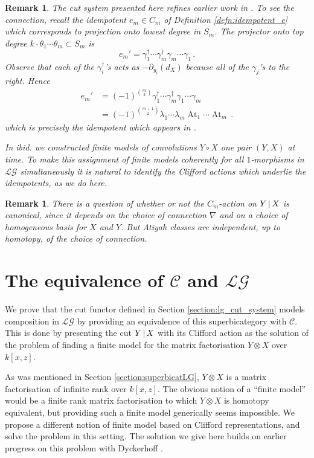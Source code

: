 \documentclass[english,letter paper,12pt,leqno]{article}
\theoremstyle{example}
\newtheorem{remark}[theorem]{Remark}
\numberwithin{equation}{section}
\def\LG{\mathcal{LG}}
\def\L{\mathcal{C}}
\def\ferm{\gamma}
\def\fermc{\gamma^\dagger}
\DeclareMathOperator{\At}{At}
\begin{document}
\begin{remark}\label{remark:relation_to_toby_paper} The cut system presented here refines earlier work in \cite{dm1102.2957}. To see the connection, recall the idempotent $e_m \in C_m$ of Definition \ref{defn:idempotent_e} which corresponds to projection onto lowest degree in $S_m$. The projector onto top degree $k \cdot \theta_1 \cdots \theta_m \subset S_m$ is 
\[
e_m' = \fermc_1 \cdots \fermc_m \ferm_m \cdots \ferm_1\,.
\]
Observe that each of the $\fermc_i$'s acts as $- \partial_{y_i}(d_X)$ because all of the $\ferm_j$'s to the right. Hence
\begin{align*}
e_m' &= (-1)^{\binom{m}{2}} \fermc_1 \cdots \fermc_m \ferm_1 \cdots \ferm_m \\
&= (-1)^{\binom{m+1}{2}} \lambda_1 \cdots \lambda_m \At_1 \cdots \At_m\,.
\end{align*}
which is precisely the idempotent which appears in \cite[Corollary 10.4]{dm1102.2957}.

In \emph{ibid.} we constructed finite models of convolutions $Y \circ X$ one pair $(Y,X)$ at time. To make this assignment of finite models coherently for all $1$-morphisms in $\LG$ simultaneously it is natural to identify the Clifford actions which underlie the idempotents, as we do here.
\end{remark}

\begin{remark} There is a question of whether or not the $C_m$-action on $Y \,|\, X$ is canonical, since it depends on the choice of connection $\nabla$ and on a choice of homogeneous basis for $X$ and $Y$. But Atiyah classes are independent, up to homotopy, of the choice of connection.
\end{remark}

\section{The equivalence of $\L$ and $\LG$}\label{section:equivllg}

We prove that the cut functor defined in Section \ref{section:lg_cut_system} models composition in $\LG$ by providing an equivalence of this superbicategory with $\L$. This is done by presenting the cut $Y \,|\, X$ with its Clifford action as the solution of the problem of finding a finite model for the matrix factorisation $Y \otimes X$ over $k[x,z]$.

As was mentioned in Section \ref{section:superbicatLG}, $Y \otimes X$ is a matrix factorisation of infinite rank over $k[x,z]$. The obvious notion of a ``finite model'' would be a finite rank matrix factorisation to which $Y \otimes X$ is homotopy equivalent, but providing such a finite model generically seems impossible. We propose a different notion of finite model based on Clifford representations, and solve the problem in this setting. The solution we give here builds on earlier progress on this problem with Dyckerhoff \cite{dm1102.2957}. 
\end{document}
